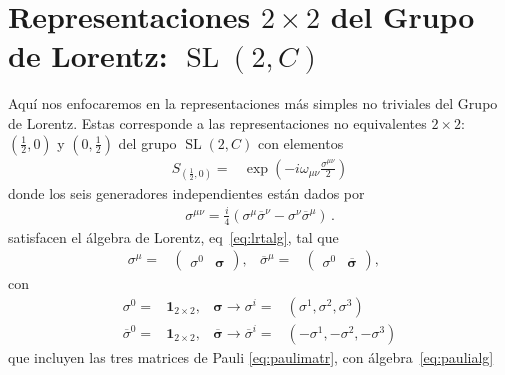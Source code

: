 \section{Representaciones $2\times 2$ del Grupo de Lorentz: $\operatorname{SL}(2,C)$}
\begin{frame}


Aquí nos enfocaremos en la representaciones más simples no triviales del Grupo de Lorentz. Estas corresponde a las representaciones no equivalentes $2\times2$: $(\frac{1}{2},0)$ y $(0,\frac{1}{2})$ del grupo $\operatorname{SL}(2,C)$ con elementos 
\begin{align}
  \label{eq:slamo}
  S_{\left( \frac{1}{2},0 \right)}=&\exp\left(-i \omega_{\mu\nu}\frac{\sigma^{\mu\nu}}{2}\right)\nonumber
\end{align}
donde los seis generadores independientes están dados por
\begin{align}
  \sigma^{\mu \nu}=\frac{i}{4}\left(\sigma^{\mu} \overline{\sigma}^{\nu}-\sigma^{\nu} \overline{\sigma}^{\mu}\right)\,.
\end{align}
satisfacen el álgebra de Lorentz, eq~\eqref{eq:lrtalg}, tal que
\begin{align}
  \sigma^{\mu}=&\begin{pmatrix}
    \sigma^0 & \boldsymbol{\sigma}
\end{pmatrix}, & 
  \overline{\sigma}^{\mu}=&\begin{pmatrix}
    \sigma^0 & \overline{\boldsymbol{\sigma}}
\end{pmatrix}, & 
\end{align}
con
\begin{align}
  \sigma^0=&\mathbf{1}_{2\times2},& \boldsymbol{\sigma}\to \sigma^{i} =&(\sigma^1,\sigma^2,\sigma^3)\nonumber\\
  \overline{\sigma}^0=&\mathbf{1}_{2\times2},&\overline{\boldsymbol{\sigma}}\to \overline{\sigma}^{i} =&(-\sigma^1,-\sigma^2,-\sigma^3)
\end{align}
que incluyen las tres matrices de  Pauli \eqref{eq:paulimatr}, con álgebra~\eqref{eq:paulialg}
\end{frame}

